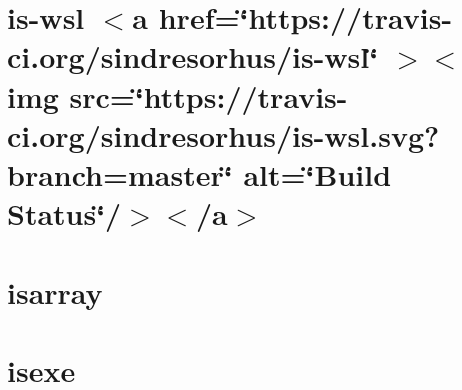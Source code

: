 \documentclass[twoside]{book}
\newcommand{\+}{\discretionary{\mbox{\scriptsize$\hookleftarrow$}}{}{}}
\begin{document}
\chapter{is-\/wsl \texorpdfstring{$<$}{<}a href=\char`\"{}https\+://travis-\/ci.\+org/sindresorhus/is-\/wsl\char`\"{} \texorpdfstring{$>$}{>}\texorpdfstring{$<$}{<}img src=\char`\"{}https\+://travis-\/ci.\+org/sindresorhus/is-\/wsl.\+svg?branch=master\char`\"{} alt=\char`\"{}\+Build Status\char`\"{}/\texorpdfstring{$>$}{>}\texorpdfstring{$<$}{<}/a\texorpdfstring{$>$}{>}}
\label{md__c___users_vaishnavi_jadhav__desktop__developer_code_mean_stack_example_client_node_modules_is_wsl_readme}

\chapter{isarray}
\label{md__c___users_vaishnavi_jadhav__desktop__developer_code_mean_stack_example_client_node_modules_isarray__r_e_a_d_m_e}

\chapter{isexe}
\label{md__c___users_vaishnavi_jadhav__desktop__developer_code_mean_stack_example_client_node_modules_isexe__r_e_a_d_m_e}

\end{document}
